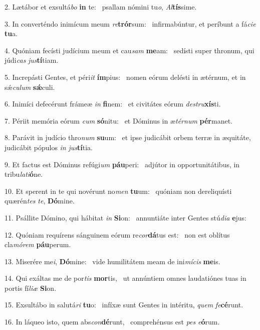 2. Lætábor et exsultá\textit{bo} \textbf{in} te: \ast\  psallam nómini tu\textit{o}, \textit{Al}\textbf{tís}sime.\

3. In converténdo inimícum meum \textit{re}\textbf{trór}sum: \ast\  infirmabúntur, et períbunt a fá\textit{ci}\textit{e} \textbf{tu}a.\

4. Quóniam fecísti judícium meum et cau\textit{sam} \textbf{me}am: \ast\  sedísti super thronum, qui júdi\textit{cas} \textit{jus}\textbf{tí}tiam.\

5. Increpásti Gentes, et péri\textit{it} \textbf{ím}pius: \ast\  nomen eórum delésti in ætérnum, et in sǽ\textit{cu}\textit{lum} \textbf{sǽ}culi.\

6. Inimíci defecérunt frámeæ \textit{in} \textbf{fi}nem: \ast\  et civitátes eórum \textit{de}\textit{stru}\textbf{xís}ti.\

7. Périit memória eórum \textit{cum} \textbf{só}nitu: \ast\  et Dóminus in æ\textit{tér}\textit{num} \textbf{pér}manet.\

8. Parávit in judício thro\textit{num} \textbf{su}um: \ast\  et ipse judicábit orbem terræ in æquitáte, judicábit pópulos \textit{in} \textit{jus}\textbf{tí}tia.\

9. Et factus est Dóminus refúgi\textit{um} \textbf{páu}peri: \ast\  adjútor in opportunitátibus, in tribu\textit{la}\textit{ti}\textbf{ó}ne.\

10. Et sperent in te qui novérunt no\textit{men} \textbf{tu}um: \ast\  quóniam non dereliquísti quærén\textit{tes} \textit{te}, \textbf{Dó}mine.\

11. Psállite Dómino, qui hábitat \textit{in} \textbf{Si}on: \ast\  annuntiáte inter Gentes stú\textit{di}\textit{a} \textbf{e}jus:\

12. Quóniam requírens sánguinem eórum re\textit{cor}\textbf{dá}tus est: \ast\  non est oblítus cla\textit{mó}\textit{rem} \textbf{páu}perum.\

13. Miserére me\textit{i}, \textbf{Dó}mine: \ast\  vide humilitátem meam de ini\textit{mí}\textit{cis} \textbf{me}is.\

14. Qui exáltas me de por\textit{tis} \textbf{mor}tis, \ast\  ut annúntiem omnes laudatiónes tuas in portis fí\textit{li}\textit{æ} \textbf{Si}on.\

15. Exsultábo in salutá\textit{ri} \textbf{tu}o: \ast\  infíxæ sunt Gentes in intéritu, \textit{quem} \textit{fe}\textbf{cé}runt.\

16. In láqueo isto, quem abs\textit{con}\textbf{dé}runt, \ast\  comprehénsus est \textit{pes} \textit{e}\textbf{ó}rum.\


